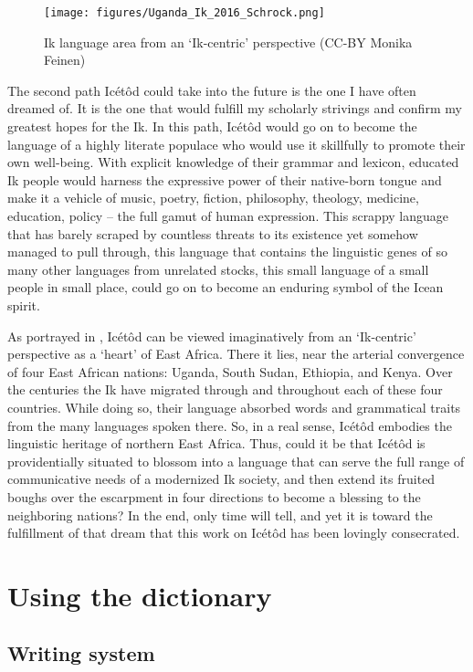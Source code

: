    

\begin{figure}
\texttt{[image: figures/Uganda\_Ik\_2016\_Schrock.png]}
\caption{Ik language area from an ‘Ik-centric’ perspective \tiny{(CC-BY Monika Feinen)}}
\label{fig:1}
\end{figure}

The second path Icétôd could take into the future is the one I have often dreamed of. It is the one that would fulfill my scholarly strivings and confirm my greatest hopes for the Ik. In this path, Icétôd would go on to become the language of a highly literate populace who would use it skillfully to promote their own well-being. With explicit knowledge of their grammar and lexicon, educated Ik people would harness the expressive power of their native-born tongue and make it a vehicle of music, poetry, fiction, philosophy, theology, medicine, education, policy – the full gamut of human expression. This scrappy language that has barely scraped by countless threats to its existence yet somehow managed to pull through, this language that contains the linguistic genes of so many other languages from unrelated stocks, this small language of a small people in small place, could go on to become an enduring symbol of the Icean spirit. 

As portrayed in , Icétôd can be viewed imaginatively from an ‘Ik-centric’ perspective as a ‘heart’ of East Africa. There it lies, near the arterial convergence of four East African nations: Uganda, South Sudan, Ethiopia, and Kenya. Over the centuries the Ik have migrated through and throughout each of these four countries. While doing so, their language absorbed words and grammatical traits from the many languages spoken there. So, in a real sense, Icétôd embodies the linguistic heritage of northern East Africa. Thus, could it  be that Icétôd is providentially situated to blossom into a language that can serve the full range of communicative needs of a modernized Ik society, and then extend its fruited boughs over the escarpment in four directions to become a blessing to the neighboring nations? In the end, only time will tell, and yet it is toward the fulfillment of that dream that this work on Icétôd has been lovingly consecrated.
 
\section{Using the dictionary}\label{sec:1.3}
\subsection{Writing system}\label{sec:1.3.1}

